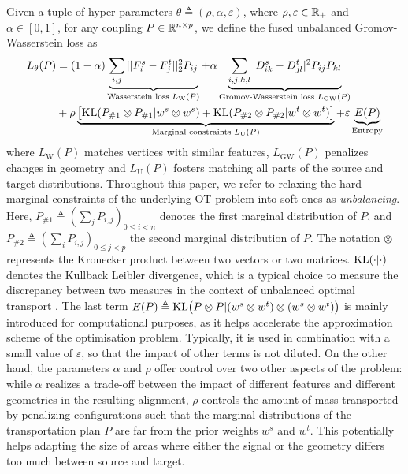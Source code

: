 Given a tuple of hyper-parameters $\theta \triangleq (\rho, \alpha, \varepsilon)$,
where $\rho, \varepsilon \in \mathbb R_+$ and $\alpha \in [0,1]$,
for any coupling $P \in \mathbb R^{n \times p}$,
we define the fused unbalanced Gromov-Wasserstein loss as
\begin{equation}
    \label{eq:fugw_obj_func}
    \begin{split}
        L_{\theta}(P) &=
        (1 - \alpha) \underbrace{\sum_{i,j} || F^s_i - F^t_j||_2^2 P_{ij}}_{\text{Wasserstein loss } L_{\text{W}}(P)}
        + \alpha \underbrace{\sum_{i,j,k,l} | D^s_{ik} - D^t_{jl}|^2 P_{ij} P_{kl}}_{\text{Gromov-Wasserstein loss } L_{\text{GW}}(P)} \\
        &+ \rho \underbrace{\left[ \text{KL}(P_{\# 1} \otimes P_{\# 1} \vert w^s \otimes w^s)
        + \text{KL}(P_{\# 2} \otimes P_{\# 2} \vert w^t \otimes w^t) \right]}_{\text{Marginal constraints } L_{\text{U}}(P)}
        + \varepsilon \underbrace{E(P)}_{\text{Entropy}}
    \end{split}
\end{equation}
where $L_{\text{W}}(P)$ matches vertices with similar features,
$L_{\text{GW}}(P)$ penalizes changes in geometry
and $L_{\text{U}}(P)$ fosters matching all parts of the source and target distributions.
Throughout this paper, we refer to relaxing the hard marginal constraints of the underlying
OT problem into soft ones as \textit{unbalancing}.
Here, $P_{\# 1} \triangleq (\sum_j P_{i,j})_{0 \leq i < n}$ denotes
the first marginal distribution of $P$,
and $P_{\# 2} \triangleq (\sum_i P_{i,j})_{0 \leq j < p}$
the second marginal distribution of $P$. The notation $\otimes$ represents
the Kronecker product between two vectors or two matrices.
$\text{KL}(\cdot|\cdot)$ denotes the Kullback Leibler divergence,
which is a typical choice to measure the discrepancy between two measures
in the context of unbalanced optimal transport \citep{Liero18}.
The last term $E(P) \triangleq \text{KL} \big(P \otimes P | (w^s \otimes w^t) \otimes (w^s \otimes w^t)\big)$
is mainly introduced for computational purposes, as it helps accelerate
the approximation scheme of the optimisation problem. Typically,
it is used in combination with a small value of $\varepsilon$,
so that the impact of other terms is not diluted. On the other hand,
the parameters $\alpha$ and $\rho$ offer control over two other aspects of the problem:
while $\alpha$ realizes a trade-off between the impact of different features and
different geometries in the resulting alignment, $\rho$ controls the amount of
mass transported by penalizing configurations such that the marginal distributions
of the transportation plan $P$ are far from the prior weights $w^s$ and $w^t$.
This potentially helps adapting the size of areas where either the signal or the geometry
differs too much between source and target.


